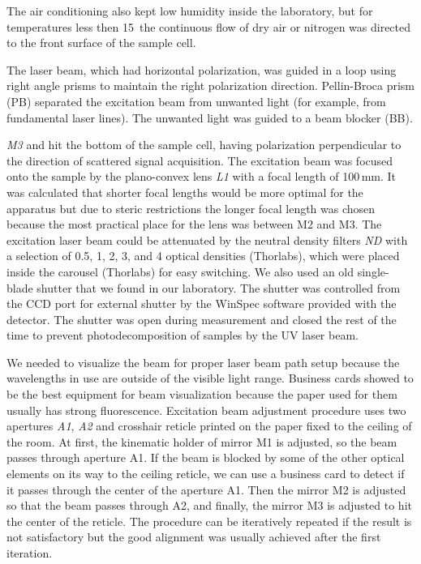 The air conditioning also kept low humidity inside the laboratory, but for
temperatures less then 15\,\textcelsius{} the continuous flow of dry air or
nitrogen was directed to the front surface of the sample cell.

The laser beam, which had horizontal polarization, was guided in a loop using
right angle prisms to maintain the right polarization direction.
Pellin-Broca prism (PB) separated the excitation beam from unwanted light
(for example, from fundamental laser lines).
The unwanted light was guided to a beam blocker (BB).

\emph{M3} and hit the bottom of the sample cell, having polarization
perpendicular to the direction of scattered signal acquisition.
The excitation beam was focused onto the sample by the plano-convex lens
\emph{L1} with a focal length of 100\,mm.
It was calculated that shorter focal lengths would be more optimal for the
apparatus but due to steric restrictions the longer focal length was
chosen because the most practical place for the lens was between M2 and M3.
The excitation laser beam could be attenuated by
the neutral density filters \emph{ND} with a selection of 0.5, 1, 2, 3, and 4
optical densities (Thorlabs), which were placed inside the carousel (Thorlabs)
for easy switching.
We also used an old single-blade shutter that we found in our laboratory.
The shutter was controlled from the CCD port for external shutter by the
WinSpec software provided with the detector.
The shutter was open during measurement and closed the rest of the time
to prevent photodecomposition of samples by the UV laser beam.

We needed to visualize the beam for proper laser beam path setup because the
wavelengths in use are outside of the visible light range.
Business cards showed to be the best equipment for beam visualization because
the paper used for them usually has strong fluorescence.
Excitation beam adjustment procedure uses two apertures \emph{A1}, \emph{A2}
and crosshair reticle printed on the paper fixed to the ceiling of the room.
At first, the kinematic holder of mirror M1 is adjusted, so the beam passes
through aperture A1.
If the beam is blocked by some of the other optical elements on its way to the
ceiling reticle, we can use a business card to detect if it passes through the
center of the aperture A1.
Then the mirror M2 is adjusted so that the beam passes through A2, and finally,
the mirror M3 is adjusted to hit the center of the reticle.
The procedure can be iteratively repeated if the result is not satisfactory but
the good alignment was usually achieved after the first iteration.

